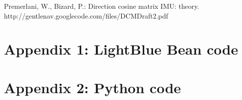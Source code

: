 \documentclass[12pt,journal]{IEEEtran}
\begin{document}
\begin{thebibliography}{1}
 Premerlani, W., Bizard, P.: Direction cosine matrix	IMU: theory. http://gentlenav.googlecode.com/files/DCMDraft2.pdf
\end{thebibliography}

\newpage
\onecolumn

\section{Appendix 1: LightBlue Bean code}
\small{

}

\section{Appendix 2: Python code}
\small{

}
\end{document}
